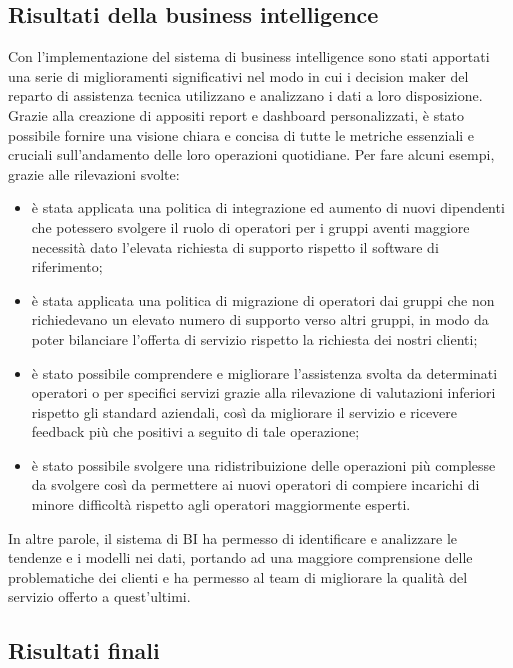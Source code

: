 \subsection{Risultati della business intelligence}

Con l'implementazione del sistema di business intelligence sono stati apportati una serie di miglioramenti significativi nel modo in cui i decision maker del reparto di assistenza tecnica utilizzano e analizzano i dati a loro disposizione. Grazie alla creazione di appositi report e dashboard personalizzati, è stato possibile fornire una visione chiara e concisa di tutte le metriche essenziali e cruciali sull'andamento delle loro operazioni quotidiane. Per fare alcuni esempi, grazie alle rilevazioni svolte:

\begin{itemize}
    \item è stata applicata una politica di integrazione ed aumento di nuovi dipendenti che potessero svolgere il ruolo di operatori per i gruppi aventi maggiore necessità dato l'elevata richiesta di supporto rispetto il software di riferimento;
    \item è stata applicata una politica di migrazione di operatori dai gruppi che non richiedevano un elevato numero di supporto verso altri gruppi, in modo da poter bilanciare l'offerta di servizio rispetto la richiesta dei nostri clienti;
    \item è stato possibile comprendere e migliorare l'assistenza svolta da determinati operatori o per specifici servizi grazie alla rilevazione di valutazioni inferiori rispetto gli standard aziendali, così da migliorare il servizio e ricevere feedback più che positivi a seguito di tale operazione;
    \item è stato possibile svolgere una ridistribuizione delle operazioni più complesse da svolgere così da permettere ai nuovi operatori di compiere incarichi di minore difficoltà rispetto agli operatori maggiormente esperti.
\end{itemize}

In altre parole, il sistema di BI ha permesso di identificare e analizzare le tendenze e i modelli nei dati, portando ad una maggiore comprensione delle problematiche dei clienti e ha permesso al team di migliorare la qualità del servizio offerto a quest'ultimi.

\subsection{Risultati finali}

